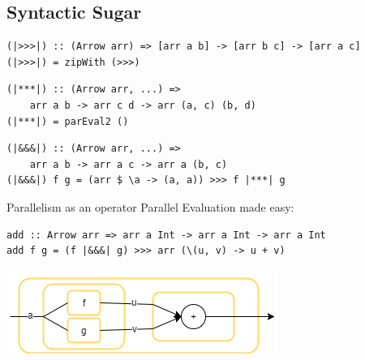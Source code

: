 \subsection{Syntactic Sugar}
\begin{frame}[fragile]
\begin{lstlisting}[frame=htrbl]
(|>>>|) :: (Arrow arr) => [arr a b] -> [arr b c] -> [arr a c]
(|>>>|) = zipWith (>>>)
\end{lstlisting}

\begin{lstlisting}[frame=htrbl]
(|***|) :: (Arrow arr, ...) =>
	arr a b -> arr c d -> arr (a, c) (b, d)
(|***|) = parEval2 ()
\end{lstlisting}

\begin{lstlisting}[frame=htrbl]
(|&&&|) :: (Arrow arr, ...) =>
	arr a b -> arr a c -> arr a (b, c)
(|&&&|) f g = (arr $ \a -> (a, a)) >>> f |***| g
\end{lstlisting}
\end{frame}

\begin{frame}[fragile]{Parallelism as an operator}
Parallel Evaluation made easy:
\begin{lstlisting}[frame=htrbl]
add :: Arrow arr => arr a Int -> arr a Int -> arr a Int
add f g = (f |&&&| g) >>> arr (\(u, v) -> u + v)
\end{lstlisting}
\begin{center}
	\includegraphics[scale=0.6]{images/addA-comb}
\end{center}
\end{frame}